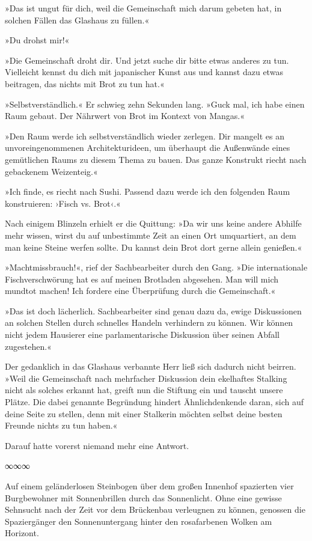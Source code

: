 »Das ist ungut für dich, weil die Gemeinschaft mich darum gebeten hat, in solchen Fällen das Glashaus zu füllen.«

»Du drohst mir!«

»Die Gemeinschaft droht dir. Und jetzt suche dir bitte etwas anderes zu tun. Vielleicht kennst du dich mit japanischer Kunst aus und kannst dazu etwas beitragen, das nichts mit Brot zu tun hat.«

»Selbstverständlich.« Er schwieg zehn Sekunden lang. »Guck mal, ich habe einen Raum gebaut. Der Nährwert von Brot im Kontext von Mangas.«

»Den Raum werde ich selbstverständlich wieder zerlegen. Dir mangelt es an unvoreingenommenen Architekturideen, um überhaupt die Außenwände eines gemütlichen Raums zu diesem Thema zu bauen. Das ganze Konstrukt riecht nach gebackenem Weizenteig.«

»Ich finde, es riecht nach Sushi. Passend dazu werde ich den folgenden Raum konstruieren: ›Fisch vs. Brot‹.«

Nach einigem Blinzeln erhielt er die Quittung: »Da wir uns keine andere Abhilfe mehr wissen, wirst du auf unbestimmte Zeit an einen Ort umquartiert, an dem man keine Steine werfen sollte. Du kannst dein Brot dort gerne allein genießen.«

»Machtmissbrauch!«, rief der Sachbearbeiter durch den Gang. »Die internationale Fischverschwörung hat es auf meinen Brotladen abgesehen. Man will mich mundtot machen! Ich fordere eine Überprüfung durch die Gemeinschaft.«

»Das ist doch lächerlich. Sachbearbeiter sind genau dazu da, ewige Diskussionen an solchen Stellen durch schnelles Handeln verhindern zu können. Wir können nicht jedem Hausierer eine parlamentarische Diskussion über seinen Abfall zugestehen.«

Der gedanklich in das Glashaus verbannte Herr ließ sich dadurch nicht beirren. »Weil die Gemeinschaft nach mehrfacher Diskussion dein ekelhaftes Stalking nicht als solches erkannt hat, greift nun die Stiftung ein und tauscht unsere Plätze. Die dabei genannte Begründung hindert Ähnlichdenkende daran, sich auf deine Seite zu stellen, denn mit einer Stalkerin möchten selbst deine besten Freunde nichts zu tun haben.«

Darauf hatte vorerst niemand mehr eine Antwort.

\begin{center}
∞∞∞
\end{center}

Auf einem geländerlosen Steinbogen über dem großen Innenhof spazierten vier Burgbewohner mit Sonnenbrillen durch das Sonnenlicht. Ohne eine gewisse Sehnsucht nach der Zeit vor dem Brückenbau verleugnen zu können, genossen die Spaziergänger den Sonnenuntergang hinter den rosafarbenen Wolken am Horizont.

